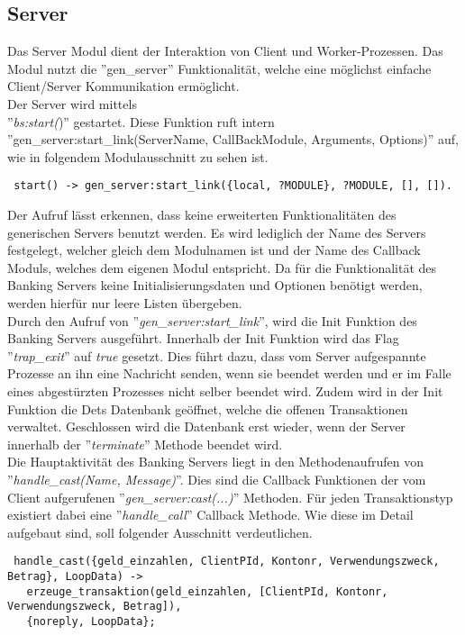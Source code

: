 \subsection{Server}
Das Server Modul dient der Interaktion von Client und Worker-Prozessen. Das Modul nutzt die ''gen\_server'' Funktionalität, welche eine möglichst einfache Client/Server Kommunikation ermöglicht.\\
Der Server wird mittels \\''\textit{bs:start(})'' gestartet. Diese Funktion ruft intern ''gen\_server:start\_link(ServerName, CallBackModule, Arguments, Options)'' auf, wie in folgendem Modulausschnitt zu sehen ist.
\begin{lstlisting}
 start() -> gen_server:start_link({local, ?MODULE}, ?MODULE, [], []).
\end{lstlisting}
Der Aufruf lässt erkennen, dass keine erweiterten Funktionalitäten des generischen Servers benutzt werden. Es wird lediglich der Name des Servers festgelegt, welcher gleich dem Modulnamen ist und der Name des Callback Moduls, welches dem eigenen Modul entspricht. Da für die Funktionalität des Banking Servers keine Initialisierungsdaten und Optionen benötigt werden, werden hierfür nur leere Listen übergeben.\\
Durch den Aufruf von ''\textit{gen\_server:start\_link}'', wird die Init Funktion des Banking Servers ausgeführt.
Innerhalb der Init Funktion wird das Flag ''\textit{trap\_exit}'' auf \textit{true} gesetzt. Dies führt dazu, dass vom Server aufgespannte Prozesse an ihn eine Nachricht senden, wenn sie beendet werden und er im Falle eines abgestürzten Prozesses nicht selber beendet wird. Zudem wird in der Init Funktion die Dets Datenbank geöffnet, welche die offenen Transaktionen verwaltet. Geschlossen wird die Datenbank erst wieder, wenn der Server innerhalb der ''\textit{terminate}'' Methode beendet wird.\\
Die Hauptaktivität des Banking Servers liegt in den Methodenaufrufen von ''\textit{handle\_cast(Name, Message)}''. Dies sind die Callback Funktionen der vom Client aufgerufenen ''\textit{gen\_server:cast(...)}'' Methoden. Für jeden Transaktionstyp existiert dabei eine ''\textit{handle\_call}'' Callback Methode. Wie diese im Detail aufgebaut sind, soll folgender Ausschnitt verdeutlichen.
\begin{lstlisting}
 handle_cast({geld_einzahlen, ClientPId, Kontonr, Verwendungszweck, Betrag}, LoopData) ->
   erzeuge_transaktion(geld_einzahlen, [ClientPId, Kontonr, Verwendungszweck, Betrag]),
   {noreply, LoopData};
\end{lstlisting}
